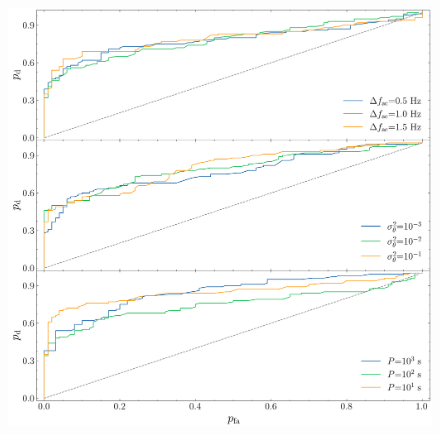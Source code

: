 \documentclass[pra,superscriptaddress,reprint,amsmath,amssymb,nofootinbib]{revtex4-2}
\providecommand{\DIFaddend}{} %
\providecommand{\DIFaddbeginFL}{} %
\providecommand{\DIFaddendFL}{} %
\providecommand{\DIFdelbeginFL}{} %
\providecommand{\DIFdelendFL}{} %
\newcommand{\DIFscaledelfig}{0.5}
\newlength{\DIFdelgraphicswidth} %
\newlength{\DIFdelgraphicsheight} %
\newcommand{\DIFaddincludegraphics}[2][]{{\color{blue}\fbox{\DIFOincludegraphics[#1]{#2}}}} %
\newcommand{\DIFdelincludegraphics}[2][]{%
\sbox{\DIFdelgraphicsbox}{\DIFOincludegraphics[#1]{#2}}%
\settoboxwidth{\DIFdelgraphicswidth}{\DIFdelgraphicsbox} %
\settoboxtotalheight{\DIFdelgraphicsheight}{\DIFdelgraphicsbox} %
\scalebox{\DIFscaledelfig}{%
\parbox[b]{\DIFdelgraphicswidth}{\usebox{\DIFdelgraphicsbox}\\[-\baselineskip] \rule{\DIFdelgraphicswidth}{0em}}\llap{\resizebox{\DIFdelgraphicswidth}{\DIFdelgraphicsheight}{%
\setlength{\unitlength}{\DIFdelgraphicswidth}%
\begin{picture}(1,1)%
\thicklines\linethickness{2pt} %
{\color[rgb]{1,0,0}\put(0,0){\framebox(1,1){}}}%
{\color[rgb]{1,0,0}\put(0,0){\line( 1,1){1}}}%
{\color[rgb]{1,0,0}\put(0,1){\line(1,-1){1}}}%
\end{picture}%
}\hspace*{3pt}}} %
} %
\DeclareRobustCommand{\DIFaddend}{\DIFOaddend \let\includegraphics\DIFOincludegraphics} %
\DeclareRobustCommand{\DIFaddbeginFL}{\DIFOaddbeginFL \let\includegraphics\DIFaddincludegraphics} %
\DeclareRobustCommand{\DIFaddendFL}{\DIFOaddendFL \let\includegraphics\DIFOincludegraphics} %
\DeclareRobustCommand{\DIFdelbeginFL}{\DIFOdelbeginFL \let\includegraphics\DIFdelincludegraphics} %
\DeclareRobustCommand{\DIFdelendFL}{\DIFOaddendFL \let\includegraphics\DIFOincludegraphics} %
\begin{document}
\DIFaddend \begin{figure}
	\begin{center}
		\DIFdelbeginFL %
\DIFdelendFL \DIFaddbeginFL \includegraphics[width=\columnwidth]{images/roc_curve_mains_power_params}
	\DIFaddendFL \end{center}

\end{figure}
\end{document}

